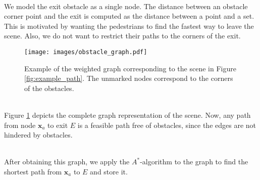 \documentclass{article}
\renewcommand{\vec}[1]{\mathbf{#1}}
\begin{document}
\ \\
We model the exit obstacle as a single node. The distance between an obstacle corner point and the exit is computed as the distance between a point and a set. This is motivated by wanting the pedestrians to find the fastest way to leave the scene. Also, we do not want to restrict their paths to the corners of the exit.
\begin{figure}[h]
	\centering
	\texttt{[image: images/obstacle\_graph.pdf]}
	\caption{Example of the weighted graph corresponding to the scene in Figure \ref{fig:example_path}. The unmarked nodes correspond to the corners of the obstacles.}
	\label{fig:example_graph}
\end{figure}\\
Figure \ref{fig:example_graph} depicts the complete graph representation of the scene. Now, any path from node $\vec{x}_a$ to exit $E$ is a feasible path free of obstacles, since the edges are not hindered by obstacles.

\ \\
After obtaining this graph, we apply the $A^*$-algorithm to the graph to find the shortest path from $\vec{x}_a$ to $E$ and store it.
\newpage
\end{document}
